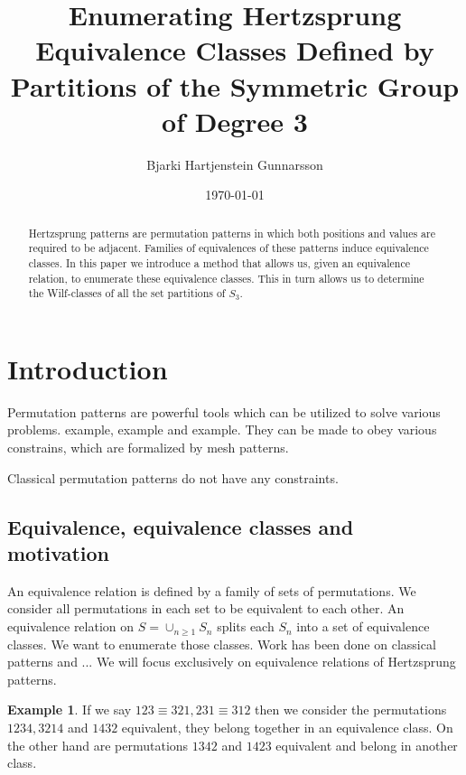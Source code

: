 \documentclass[a4paper, 11pt]{article}
\theoremstyle{definition}
\newtheorem{example}[theorem]{Example}
\newcommand{\Sym}{S}
\begin{document}
\title{Enumerating Hertzsprung Equivalence Classes Defined by Partitions of the Symmetric Group of Degree 3}
\author{Bjarki Hartjenstein Gunnarsson}
\date{\today}
\maketitle

\begin{abstract}
    Hertzsprung patterns are permutation patterns in which both positions and
    values are required to be adjacent. Families of equivalences of these
    patterns induce equivalence classes. In this paper we introduce a method
    that allows us, given an equivalence relation, to enumerate these
    equivalence classes. This in turn allows us to determine the Wilf-classes of
    all the set partitions of $\Sym_3$.
\end{abstract}

\section{Introduction}
Permutation patterns are powerful tools which can be utilized to solve various
problems. example, example and example. They can be made to obey various
constrains, which are formalized by mesh patterns. \cite{claesson:2011}

Classical permutation patterns do not have any constraints. 

\subsection{Equivalence, equivalence classes and motivation}
An equivalence relation is defined by a family of sets of permutations. We
consider all permutations in each set to be equivalent to each other. An
equivalence relation on $\Sym = \cup_{n \geq 1} \Sym_n$ splits each $\Sym_n$
into a set of equivalence classes.  We want to enumerate those classes.  Work
has been done on classical patterns and ... \cite{linton:2012}  We will focus
exclusively on equivalence relations of Hertzsprung patterns. 

\begin{example}
    If we say $123 \equiv 321, 231 \equiv 312$ then we consider the permutations
    $1234, 3214$ and $1432$ equivalent, they belong together in an equivalence
    class. On the other hand are permutations $1342$ and $1423$ equivalent and belong in
    another class.
\end{example}
\end{document}
